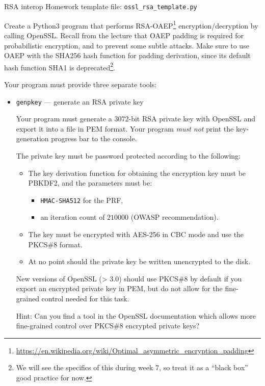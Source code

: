 \documentclass{homework}
\begin{document}
\begin{task}{RSA interop}
  Homework template file: \texttt{ossl\_rsa\_template.py}

  Create a Python3 program that performs RSA-OAEP\footnote{\url{https://en.wikipedia.org/wiki/Optimal_asymmetric_encryption_padding}} encryption/decryption by calling OpenSSL.
  Recall from the lecture that OAEP padding is required for probabilistic encryption, and to prevent some subtle attacks.
  Make sure to use OAEP with the SHA256 hash function for padding derivation, since its default hash function SHA1 is deprecated\footnote{We will see the specifics of this during week 7, so treat it as a \enquote{black box} good practice for now.}.

  \newpage

  Your program must provide three separate tools:
  \begin{itemize}
    \item \texttt{genpkey} --- generate an RSA private key

    Your program must generate a $3072$-bit RSA private key with OpenSSL and export it into a file in PEM format.
    Your program \emph{must not} print the key-generation progress bar to the console.

    The private key must be password protected according to the following:
    \begin{itemize}
      \item The key derivation function for obtaining the encryption key must be PBKDF2, and the parameters must be:
      \begin{itemize}
        \item \texttt{HMAC-SHA512} for the PRF,
        \item an iteration count of $210000$ (OWASP recommendation).
      \end{itemize}
      \item The key must be encrypted with AES-256 in CBC mode and use the PKCS\#8 format.
      \item At no point should the private key be written unencrypted to the disk.
    \end{itemize}

    \begin{tcolorbox}[title=Note]
      New versions of OpenSSL (> 3.0) should use PKCS\#8 by default if you export an encrypted private key in PEM, but do not allow for the fine-grained control needed for this task.

      Hint: Can you find a tool in the OpenSSL documentation which allows more fine-grained control over PKCS\#8 encrypted private keys? 
    \end{tcolorbox}


\end{itemize}
\end{task}
\end{document}

